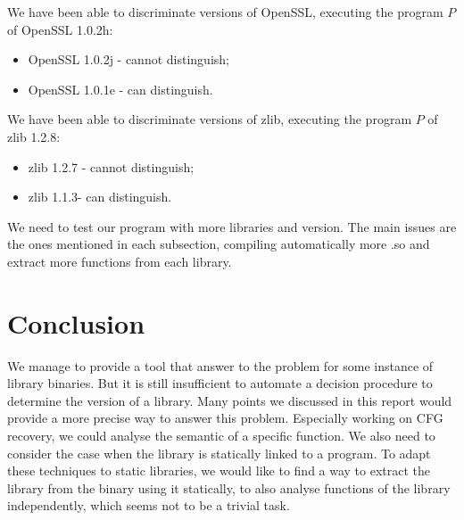\documentclass{article}
\begin{document}
        We have been able to discriminate versions of OpenSSL, executing the
        program $P$ of OpenSSL 1.0.2h:
        \begin{itemize}
            \item OpenSSL 1.0.2j - cannot distinguish; 
            \item OpenSSL 1.0.1e - can distinguish.
        \end{itemize}


        We have been able to discriminate versions of zlib, executing the
        program $P$ of zlib 1.2.8: 
        \begin{itemize}
            \item zlib 1.2.7 - cannot distinguish; 
            \item zlib 1.1.3- can distinguish.
        \end{itemize}

        We need to test our program with more libraries and version. The main
        issues are the ones mentioned in each subsection, compiling
        automatically more .so and extract more functions from each library.

    
    \section{Conclusion}
    We manage to provide a tool that answer to the problem for some instance
    of library binaries. But it is still insufficient to automate a decision
    procedure to determine the version of a library. Many points we discussed
    in this report would provide a more precise way to answer this problem.
    Especially working on CFG recovery, we could analyse the semantic of a
    specific function. We also need to consider the case when the library is
    statically linked to a program. To adapt these techniques to static
    libraries, we would like to find a way to extract the library from the binary
    using it statically, to also analyse functions of the library
    independently, which seems not to be a trivial task. 
    

\iffalse    
    \subsection{Other tools}

		\subsubsection{Coccinelle} 
            Coccinelle uses static analysis to find pattern in C source code.
            Using a known bug as a pattern leads to discover if the patch was
            applied or not. It seems not to be interesting in our case,
            because we deal with binaries.  
        \subsubsection{n-gram}
\fi
\end{document}
